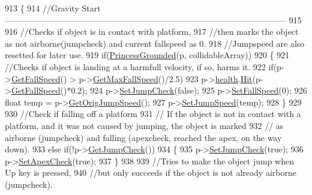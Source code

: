 \begin{DoxyCode}
913 \{
914     \textcolor{comment}{//Gravity
       Start-----------------------------------------------------------------------------------------------------}
915 
916     \textcolor{comment}{//Checks if object is in contact with platform,}
917     \textcolor{comment}{//then marks the object as not airborne(jumpcheck) and current fallspeed as 0.}
918     \textcolor{comment}{//Jumpspeed are also resetted for later use.}
919     \textcolor{keywordflow}{if}(\hyperlink{classPhysics_a081cbec413244f80e8937da3ef751c70}{PrincessGrounded}(p, collidableArray))
920     \{
921         \textcolor{comment}{//Checks if object is landing at a harmfull velocity, if so, harms it.}
922         \textcolor{keywordflow}{if}(p->\hyperlink{classPrincessObject_aba411af16e874c2c738e101cf11f9e0c}{GetFallSpeed}() > p->\hyperlink{classPrincessObject_a64acccc1494d3f5ed3050d1c1e07c169}{GetMaxFallSpeed}()/2.5)
923             p->\hyperlink{classPrincessObject_a75a7fc3924a1c6e8ba648d73907f24ce}{health}.\hyperlink{classHealth_a565eec980a98122472e88c57e43b9f16}{Hit}(p->\hyperlink{classPrincessObject_aba411af16e874c2c738e101cf11f9e0c}{GetFallSpeed}()*0.2);
924         p->\hyperlink{classPrincessObject_ac563d582ecc3fdf646c9e0c2af1936fb}{SetJumpCheck}(\textcolor{keyword}{false});
925         p->\hyperlink{classPrincessObject_abd96d1e4fed044c8e1a0f99c6b4820d4}{SetFallSpeed}(0);
926         \textcolor{keywordtype}{float} temp = p->\hyperlink{classPrincessObject_a6ca072804db87b265dd00b2ad3805578}{GetOrigJumpSpeed}();
927         p->\hyperlink{classPrincessObject_ab2428d105c01f96ac469e9718e72aa6b}{SetJumpSpeed}(temp);
928     \}
929 
930         \textcolor{comment}{//Check if falling off a platform}
931         \textcolor{comment}{// If the object is not in contact with a platform, and it was not caused by jumping, the object is
       marked}
932         \textcolor{comment}{// as airborne (jumpcheck) and falling (apexcheck, reached the apex, on the way down).}
933     \textcolor{keywordflow}{else} \textcolor{keywordflow}{if}(!p->\hyperlink{classPrincessObject_aaf0b5e607b8c0303e667498809214b1d}{GetJumpCheck}())
934     \{
935         p->\hyperlink{classPrincessObject_ac563d582ecc3fdf646c9e0c2af1936fb}{SetJumpCheck}(\textcolor{keyword}{true});
936         p->\hyperlink{classPrincessObject_a269f54cc9474075c1af91546f00f7779}{SetApexCheck}(\textcolor{keyword}{true});
937     \}
938 
939     \textcolor{comment}{//Tries to make the object jump when Up key is pressed,}
940     \textcolor{comment}{//but only succeeds if the object is not already airborne (jumpcheck).}

\end{DoxyCode}
